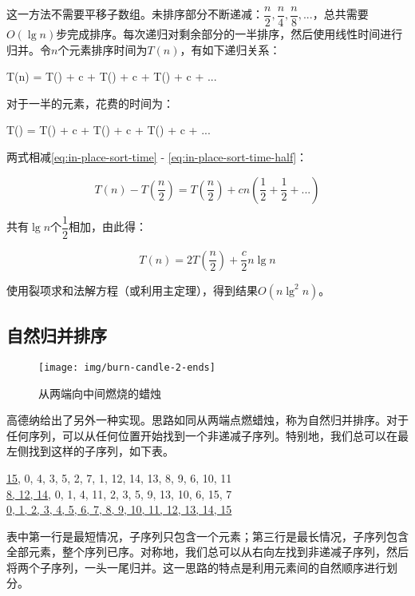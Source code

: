 \documentclass[b5paper]{ctexart}
\begin{document}
这一方法不需要平移子数组。未排序部分不断递减：$\dfrac{n}{2}, \dfrac{n}{4}, \dfrac{n}{8}, ...$，总共需要$O(\lg n)$步完成排序。每次递归对剩余部分的一半排序，然后使用线性时间进行归并。令$n$个元素排序时间为$T(n)$，有如下递归关系：

\be
T(n) = T() + c  + T() + c  + T() + c  + ...
\label{eq:in-place-sort-time}
\ee

对于一半的元素，花费的时间为：

\be
T() = T() + c  + T() + c  + T() + c  + ...
\label{eq:in-place-sort-time-half}
\ee

两式相减\cref{eq:in-place-sort-time} - \cref{eq:in-place-sort-time-half}：

\[
T(n) - T(\frac{n}{2}) = T(\frac{n}{2}) + c n (\frac{1}{2} + \frac{1}{2} + ... )
\]

共有$\lg n$个$\dfrac{1}{2}$相加，由此得：

\[
T(n) = 2 T(\frac{n}{2}) + \frac{c}{2} n \lg n
\]

使用裂项求和法解方程（或利用主定理），得到结果$O(n \lg^2 n)$。

\subsection{自然归并排序}

\begin{figure}[htbp]
 \centering
 \texttt{[image: img/burn-candle-2-ends]}
 \caption{从两端向中间燃烧的蜡烛}
 \label{fig:burn-candle}
\end{figure}

高德纳给出了另外一种实现。思路如同从两端点燃蜡烛\cite{TAOCP}，称为自然归并排序。对于任何序列，可以从任何位置开始找到一个非递减子序列。特别地，我们总可以在最左侧找到这样的子序列，如下表。

\underline{15}, 0, 4, 3, 5, 2, 7, 1, 12, 14, 13, 8, 9, 6, 10, 11 \\
\underline{8, 12, 14}, 0, 1, 4, 11, 2, 3, 5, 9, 13, 10, 6, 15, 7 \\
\underline{0, 1, 2, 3, 4, 5, 6, 7, 8, 9, 10, 11, 12, 13, 14, 15} \\
\etab

表中第一行是最短情况，子序列只包含一个元素；第三行是最长情况，子序列包含全部元素，整个序列已序。对称地，我们总可以从右向左找到非递减子序列，然后将两个子序列，一头一尾归并。这一思路的特点是利用元素间的自然顺序进行划分。
\end{document}
